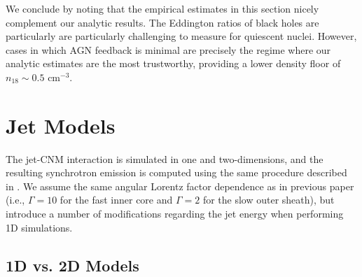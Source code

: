 \documentclass[usenatbib,fleqn]{mnras}
\newcommand\lsim{\mathrel{\rlap{\lower4pt\hbox{\hskip1pt$\sim$}}
    \raise1pt\hbox{$<$}}}
\newcommand\gsim{\mathrel{\rlap{\lower4pt\hbox{\hskip1pt$\sim$}}
    \raise1pt\hbox{$>$}}}
\newcommand{\Mbh}[1][]{M_{\bullet#1}}
\newcommand{\Msun}{{\rm M_\odot}}
\begin{document}


We conclude by noting that the empirical estimates in this section
nicely complement our analytic results.  The Eddington ratios of black
holes are particularly are particularly challenging to measure for
quiescent nuclei.  However, cases in which AGN feedback is minimal are
precisely the regime where our analytic estimates are the most
trustworthy, providing a lower density floor of $n_{18} \sim 0.5$
cm$^{-3}$.







\section{Jet Models}
\label{sec:numerical}
The jet-CNM interaction is simulated in one and two-dimensions, and
the resulting synchrotron emission is computed using the same
procedure described in \citet{Mimica+2015}. We assume the same angular
Lorentz factor dependence as in previous paper (i.e., $\Gamma = 10$
for the fast inner core and $\Gamma = 2$ for the slow outer sheath),
but introduce a number of modifications regarding the jet energy
when performing 1D simulations.

\subsection{1D vs. 2D Models}
\label{sec:2D}
\end{document}
